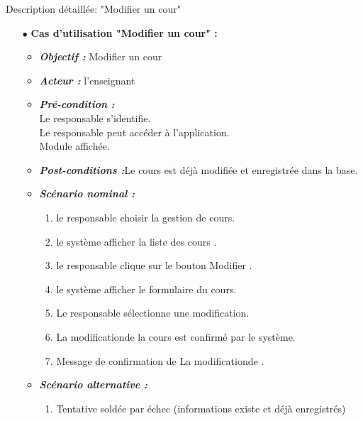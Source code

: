 {\Large \color{cyan} Description détaillée: "Modifier un cour"}
\begin{itemize}
	\item[$\bullet$] \textbf{Cas d’utilisation "Modifier un cour" :} 
	\medskip
	\begin{itemize}
		\item \textit{\textbf{Objectif :}} Modifier un cour	
		\item \textit{\textbf{Acteur :}}  l'enseignant
		\item \textit{\textbf{Pré-condition  :}} \\
		Le responsable s’identifie.\\
		Le responsable peut accéder à l’application.\\
		Module affichée.
		\item \textit{\textbf{Post-conditions   :}}Le cours est déjà modifiée et enregistrée dans
		la base. 
		\item \textit{\textbf{Scénario nominal :}}
		\begin{enumerate}
			\item le responsable choisir la gestion de cours.
			\item le système afficher la liste des cours .
			\item le responsable clique sur le bouton Modifier .
			
			\item le système afficher le formulaire du cours. 
			\item  Le responsable sélectionne une modification. 
			\item La modificationde la cours est confirmé par le système. 
			\item Message de confirmation de La modificationde .
			
		\end{enumerate}
		\item \textit{\textbf{Scénario alternative :}}
		\begin{enumerate}
			\item Tentative soldée par échec (informations existe et
			déjà enregistrés)
		\end{enumerate}
	\end{itemize}
\end{itemize}	
\bigskip




